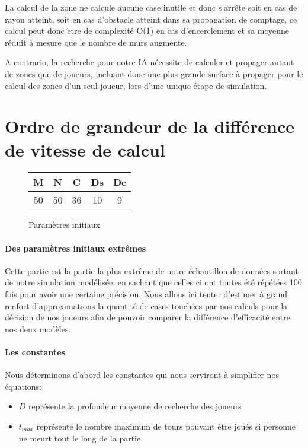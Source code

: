 		La calcul de la zone ne calcule aucune case inutile et donc s'arrête soit en cas de rayon atteint, soit en cas d'obstacle atteint dans sa propagation de comptage, ce calcul peut donc etre de complexité O(1) en cas d'encerclement et sa moyenne réduit à mesure que le nombre de murs augmente.
		
		A contrario, la recherche pour notre IA nécessite de calculer et propager autant de zones que de joueurs, incluant donc une plus grande surface à propager pour le calcul des zones d'un seul joueur, lors d'une unique étape de simulation.
	
	\section{Ordre de grandeur de la différence de vitesse de calcul}
		\begin{figure}[H]
			\centering
			\begin{tabular}{c c c c c}
				M&N&C&Ds&Dc\\\hline
				50&50&36&10&9\\				
			\end{tabular}
		\caption{Paramètres initiaux}	
		\end{figure}
		
		\paragraph{Des paramètres initiaux extrêmes}
		Cette partie est la partie la plus extrême de notre échantillon de données sortant de notre simulation modélisée, en sachant que celles ci ont toutes été répétées 100 fois pour avoir une certaine précision.
		Nous allons ici tenter d'estimer à grand renfort d'approximations la quantité de cases touchées par nos calculs pour la décision de nos joueurs afin de pouvoir comparer la différence d'efficacité entre nos deux modèles. 
		
		\paragraph{Les constantes}
		Nous déterminons d'abord les constantes qui nous serviront à simplifier nos équations:
		\begin{itemize}
			\item $D$ représente la profondeur moyenne de recherche des joueurs
			\item $t_{max}$ représente le nombre maximum de tours pouvant être joués si personne ne meurt tout le long de la partie.
		\end{itemize}
	
